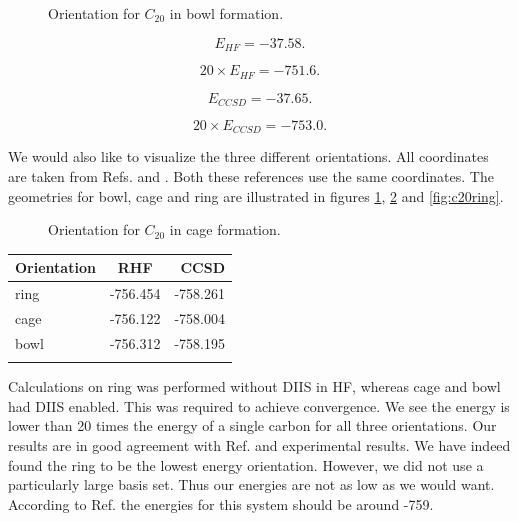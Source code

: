 \documentclass[a4paper,norsk,11pt,twoside]{report}
\begin{document}
\begin{figure}[h!]
\begin{center}
\caption{Orientation for $C_{20}$ in bowl formation.}
\label{fig:c20bowl}
\end{center}
\end{figure}

\begin{equation}
E_{HF} = -37.58 .
\end{equation}

\begin{equation}
20 \times E_{HF} = -751.6 .
\end{equation}

\begin{equation}
E_{CCSD} = -37.65 .
\end{equation}

\begin{equation}
20 \times E_{CCSD} = -753.0 .
\end{equation}

We would also like to visualize the three different orientations. All coordinates are taken from Refs.\cite{c20coordinatesarticlezz} and \cite{c20coordinatesarticlezz10}. Both these references use the same coordinates. The geometries for bowl, cage and ring are illustrated in figures \ref{fig:c20bowl}, \ref{fig:c20cage} and \ref{fig:c20ring}.\\




\begin{figure}[h!]
\begin{center}
\caption{Orientation for $C_{20}$ in cage formation.}
\label{fig:c20cage}
\end{center}
\end{figure}

\begin{center}
\begin{tabular}{ l c r }
	\hline
  	Orientation & RHF & CCSD \\ \hline
  	ring & -756.454 & -758.261  \\ \hline
  	cage & -756.122 & -758.004  \\ \hline
  	bowl & -756.312 & -758.195  \\ \hline
  	\\
	\end{tabular}
\end{center}

Calculations on ring was performed without DIIS in HF, whereas cage and bowl had DIIS enabled. This was required to achieve convergence. We see the energy is lower than 20 times the energy of a single carbon for all three orientations. Our results are in good agreement with Ref.\cite{c20coordinatesarticlezz10} and experimental results. We have indeed found the ring to be the lowest energy orientation. However, we did not use a particularly large basis set. Thus our energies are not as low as we would want. According to Ref.\cite{c20article_cite_this} the energies for this system should be around -759. \\
\end{document}
